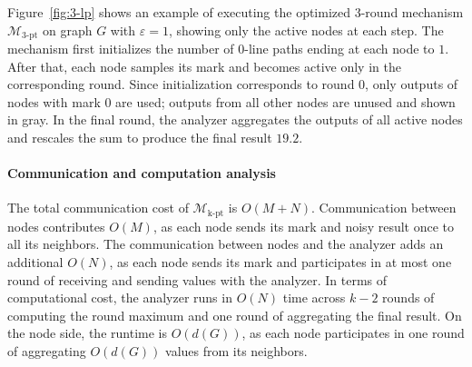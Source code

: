 Figure~\ref{fig:3-lp} shows an example of executing the optimized 3-round mechanism $\mathcal{M}_{\mathrm{3\text{-}pt}}$ on graph $G$ with $\varepsilon = 1$, showing only the active nodes at each step.
The mechanism first initializes the number of $0$-line paths ending at each node to $1$.
After that, each node samples its mark and becomes active only in the corresponding round. 
Since initialization corresponds to round $0$,  
only outputs of nodes with mark $0$ are used; outputs from all other nodes are unused and shown in gray.
In the final round, the analyzer aggregates the outputs of all active nodes and rescales the sum to produce the final result $19.2$.






\paragraph{Communication and computation analysis}  
The total communication cost of $\mathcal{M}_{\mathrm{k\text{-}pt}}$ is $O(M+N)$. Communication between nodes contributes $O(M)$, as each node sends its mark and noisy result once to all its neighbors. 
The communication between nodes and the analyzer adds an additional $O(N)$, as each node sends its mark and participates in at most one round of receiving and sending values with the analyzer.
In terms of computational cost, the analyzer runs in $O(N)$ time across $k-2$ rounds of computing the round maximum and one round of aggregating the final result. 
On the node side, the runtime is $O(d(G))$, as each node participates in one round of aggregating $O(d(G))$ values from its neighbors.






